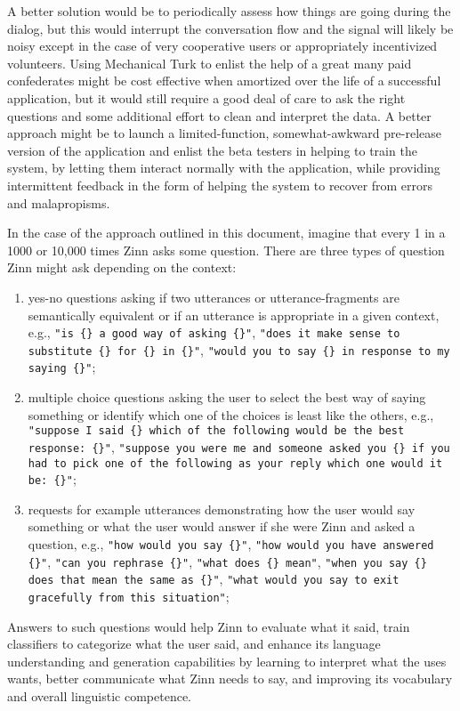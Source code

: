 \documentclass[letterpaper,12pt]{article}
\begin{document}
A better solution would be to periodically assess how things are going during the dialog, but this would interrupt the conversation flow and the signal will likely be noisy except in the case of very cooperative users or appropriately incentivized volunteers. Using Mechanical Turk to enlist the help of a great many paid confederates might be cost effective when amortized over the life of a successful application, but it would still require a good deal of care to ask the right questions and some additional effort to clean and interpret the data.  A better approach might be to launch a limited-function, somewhat-awkward pre-release version of the application and enlist the beta testers in helping to train the system, by letting them interact normally with the application, while providing intermittent feedback in the form of helping the system to recover from errors and malapropisms. 

In the case of the approach outlined in this document, imagine that every 1 in a 1000 or 10,000 times Zinn asks some question. There are three types of question Zinn might ask depending on the context:
%
\begin{enumerate}
%
\item yes-no questions asking if two utterances or utterance-fragments are semantically equivalent or if an utterance is appropriate in a given context, e.g., {\tt{"is \{\} a good way of asking \{\}"}}, {\tt{"does it make sense to substitute \{\} for \{\} in \{\}"}},  {\tt{"would you to say \{\} in response to my saying \{\}"}};
%
\item multiple choice questions asking the user to select the best way of saying something or identify which one of the choices is least like the others, e.g., {\tt{"suppose I said \{\} which of the following would be the best response: \{\}"}}, {\tt{"suppose you were me and someone asked you \{\} if you had to pick one of the following as your reply which one would it be: \{\}"}};
%
\item requests for example utterances demonstrating how the user would say something or what the user would answer if she were Zinn and asked a question, e.g., {\tt{"how would you say \{\}"}}, {\tt{"how would you have answered \{\}"}}, {\tt{"can you rephrase \{\}"}}, {\tt{"what does \{\} mean"}}, {\tt{"when you say \{\} does that mean the same as \{\}"}}, {\tt{"what would you say to exit gracefully from this situation"}};
%
\end{enumerate}
%
Answers to such questions would help Zinn to evaluate what it said, train classifiers to categorize what the user said, and enhance its language understanding and generation capabilities by learning to interpret what the uses wants, better communicate what Zinn needs to say, and improving its vocabulary and overall linguistic competence.
\end{document}
